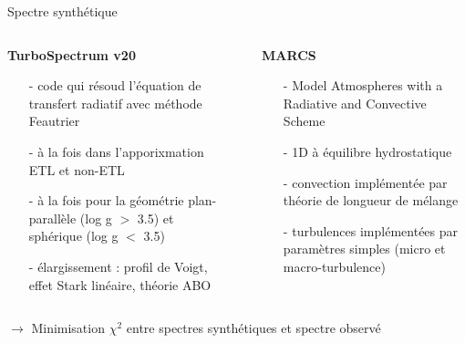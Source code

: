 \documentclass[10pt]{beamer}
\begin{document}
\begin{frame}[fragile]{Spectre synthétique}
    \begin{columns}
        \begin{column}{0.52\textwidth}
            \begin{center}
                \textbf{TurboSpectrum v20}  
                \begin{itemize}
                    \item [-] code qui résoud l'équation de transfert radiatif avec méthode Feautrier
                    \item [-] à la fois dans l'apporixmation ETL et non-ETL
                    \item [-] à la fois pour la géométrie plan-parallèle (log g $>$ 3.5) et sphérique (log g $<$ 3.5)
                    \item [-] élargissement : profil de Voigt, effet Stark linéaire, théorie ABO
                \end{itemize}
            \end{center}
        \end{column}
        \begin{column}{0.04\textwidth}
        \end{column}
        \begin{column}{0.44\textwidth}
            \begin{center}
                \textbf{MARCS}
               \begin{itemize}
                \item [-] Model Atmospheres with a Radiative and Convective Scheme
                \item [-] 1D à équilibre hydrostatique
                \item [-] convection implémentée par théorie de longueur de mélange
                \item [-] turbulences implémentées par paramètres simples (micro et macro-turbulence)
               \end{itemize}
            \end{center}
        \end{column}
\end{columns}
\vfill 
$\rightarrow$ Minimisation $\chi^2$ entre spectres synthétiques et spectre observé
\end{frame}
\end{document}
